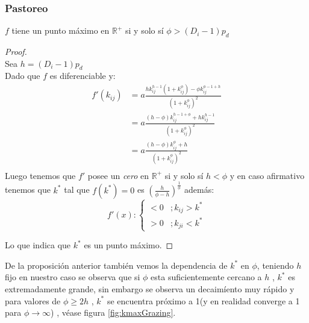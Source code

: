 \subsubsection{Pastoreo}

\begin{prop}
  $f$ tiene un punto m\'aximo en $\mathbb{R}^+$ si y solo s\'i $\phi > (D_i - 1)p_d$ 
\end{prop}

\begin{proof}
\mbox{}\\
Sea $ h = (D_i-1)p_d$\\
Dado que $f$ es diferenciable y:
  \begin{equation}
    \begin{aligned}
      f'(k_{ij}) &= a \frac{h k_{ij}^{h-1} (1 + k_{ij}^\phi) -\phi k_{ij}^{\phi-1+h}}{(1+k_{ij}^{\phi})^2} \\
            &= a \frac{(h-\phi)k_{ij}^{h-1 + \phi}  + h k_{ij}^{h-1} }{(1+k_{ij}^{\phi})^2}\\
            &= a \frac{(h-\phi)k_{ij}^\phi + h }{(1+k_{ij}^{\phi})^2}\\
     \end{aligned}
  \end{equation}
Luego tenemos que $f'$ posee un \emph{cero} en $\mathbb{R}^+$ si y solo s\'i $ h< \phi$ y en caso afirmativo tenemos que $k^*$ tal que $f(k^*) = 0$ es $(\frac{h}{\phi-h})^{\frac{1}{\phi}}$ adem\'as:
\begin{equation}
  f'(x) :
  \begin{cases}
    < 0 &; k_{ij}  > k^* \\
    > 0 &; k_{ji} < k^*
  \end{cases}
\end{equation}

Lo que indica que $k^*$ es un punto m\'aximo.
\end{proof}

De la proposici\'on anterior tambi\'en vemos la dependencia de $k^*$ en $\phi$, teniendo $h$ fijo en nuestro caso se observa que si $\phi$ esta suficientemente cercano a $h$ , $k^*$ es extremadamente grande, sin embargo se observa un decaim\'iento muy r\'apido y para valores de $\phi \geq 2h$  , $k^*$ se encuentra pr\'oximo a 1(y en realidad converge a 1 para $\phi \to \infty$) , v\'ease figura \ref{fig:kmaxGrazing}. \\

